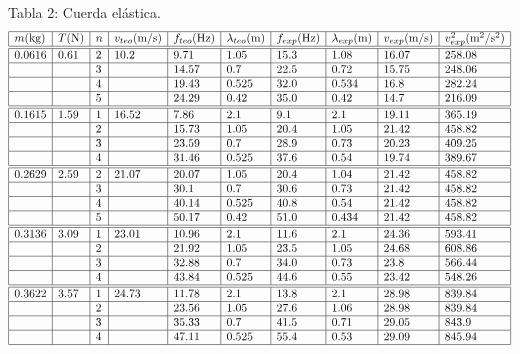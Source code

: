 \documentclass{article}
\begin{document}
\begin{center}
  Tabla 2: Cuerda elástica.
  $$
  \begin{array}{|l|l|l|l|l|l|l|l|l|l|} \hline
    m\text{(kg)} & T\text{(N)} & n & v_{teo}\text{(m/s)} & f_{teo}\text{(Hz)} & \lambda_{teo}\text{(m)} & f_{exp}\text{(Hz)} & \lambda_{exp}\text{(m)} & v_{exp}\text{(m/s)} & v_{exp}^2\text{(m\textsuperscript{2}/s\textsuperscript{2})} \\ \hline \hline
    0.0616 & 0.61 & 2 & 10.2 & 9.71 & 1.05 & 15.3 & 1.08 & 16.07 & 258.08  \\ \hline
     &  & 3 &  & 14.57 & 0.7 & 22.5 & 0.72 & 15.75 & 248.06  \\ \hline
     &  & 4 &  & 19.43 & 0.525 & 32.0 & 0.534 & 16.8 & 282.24  \\ \hline
     &  & 5 &  & 24.29 & 0.42 & 35.0 & 0.42 & 14.7 & 216.09  \\ \hline \hline
    0.1615 & 1.59 & 1 & 16.52 & 7.86 & 2.1 & 9.1 & 2.1 & 19.11 & 365.19  \\ \hline
     &  & 2 &  & 15.73 & 1.05 & 20.4 & 1.05 & 21.42 & 458.82  \\ \hline
     &  & 3 &  & 23.59 & 0.7 & 28.9 & 0.73 & 20.23 & 409.25  \\ \hline
     &  & 4 &  & 31.46 & 0.525 & 37.6 & 0.54 & 19.74 & 389.67  \\ \hline \hline
    0.2629 & 2.59 & 2 & 21.07 & 20.07 & 1.05 & 20.4 & 1.04 & 21.42 & 458.82  \\ \hline
     &  & 3 &  & 30.1 & 0.7 & 30.6 & 0.73 & 21.42 & 458.82  \\ \hline
     &  & 4 &  & 40.14 & 0.525 & 40.8 & 0.54 & 21.42 & 458.82  \\ \hline
     &  & 5 &  & 50.17 & 0.42 & 51.0 & 0.434 & 21.42 & 458.82  \\ \hline \hline
    0.3136 & 3.09 & 1 & 23.01 & 10.96 & 2.1 & 11.6 & 2.1 & 24.36 & 593.41  \\ \hline
     &  & 2 &  & 21.92 & 1.05 & 23.5 & 1.05 & 24.68 & 608.86  \\ \hline
     &  & 3 &  & 32.88 & 0.7 & 34.0 & 0.73 & 23.8 & 566.44  \\ \hline
     &  & 4 &  & 43.84 & 0.525 & 44.6 & 0.55 & 23.42 & 548.26  \\ \hline \hline
    0.3622 & 3.57 & 1 & 24.73 & 11.78 & 2.1 & 13.8 & 2.1 & 28.98 & 839.84  \\ \hline
     &  & 2 &  & 23.56 & 1.05 & 27.6 & 1.06 & 28.98 & 839.84  \\ \hline
     &  & 3 &  & 35.33 & 0.7 & 41.5 & 0.71 & 29.05 & 843.9  \\ \hline
     &  & 4 &  & 47.11 & 0.525 & 55.4 & 0.53 & 29.09 & 845.94  \\ \hline
    \end{array}
  $$
\end{center}
\end{document}
